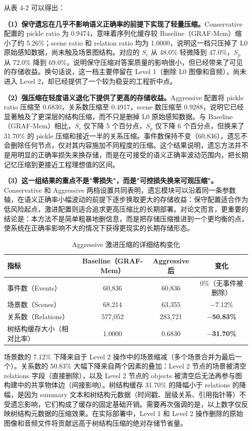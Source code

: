 从表 4-2 可以得出：

\textbf{（1）保守遗忘在几乎不影响语义正确率的前提下实现了轻量压缩。}Conservative 配置的 pickle ratio 为 0.9474，意味着序列化缓存较 Baseline（GRAF-Mem）缩小了约 5.26\%；scene ratio 和 relation ratio 均为 1.0000，说明这一档只压掉了 L0 原始感知数据，尚未触及场景图结构。对应的 $S_c$ 从 48.0\% 轻微降到 47.0\%，$S_p$ 从 72.0\% 降到 69.0\%，说明保守压缩对答案质量的影响很小，但已经带来了可见的存储收益。换句话说，这一档主要停留在 Level 1（删除 L0 图像和音频），尚未进入 Level 2，却已经提供了一个较为稳妥的工程折中点。

\textbf{（2）强压缩在轻度语义退化下提供了更高的存储收益。}Aggressive 配置将 pickle ratio 压缩至 0.6830，关系数压缩至 0.4917，scene 数压缩至 0.9288，说明它已经显著触及了更深层的结构压缩，而不只是删掉 L0 原始感知数据。与 Baseline（GRAF-Mem）相比，$S_c$ 仅下降 5 个百分点，$S_p$ 仅下降 6 个百分点，但换来了 31.70\% 的 pickle 压缩和接近一半的关系压缩。事件数保持不变（60,836），遗忘不会删除任何节点，仅对其内容施加不同程度的压缩。这个结果说明，遗忘方法并不是用明显的正确率损失来换存储，而是在可接受的语义正确率波动范围内，把长期记忆压缩到更接近工程理想值的区间。

\textbf{（3）这一组结果的重点不是"零损失"，而是"可控损失换来可观压缩"。}Conservative 和 Aggressive 两档设置共同表明，遗忘模块可以沿着同一条参数轴，在语义正确率小幅波动的前提下逐步换取更大的存储收益：保守配置适合作为低风险起点，激进配置则适合追求更高压缩比的长期部署。对论文而言，更重要的结论是：本方法不是简单粗暴地删信息，而是把存储压缩推进到一个更均衡的点，使系统在正确率影响不大的情况下获得更现实的长期存储形态。

\begin{table}[htbp]
\centering
\caption{Aggressive 激进压缩的详细结构变化}
\label{tab:4-3}
\begin{tabular}{lccc}
\toprule
指标 & Baseline（GRAF-Mem） & Aggressive 后 & 变化 \\
\midrule
事件数（Events） & 60,836 & 60,836 & 0\%（无事件被删除） \\
场景数（Scenes） & 68,214 & 63,355 & $-$7.12\% \\
关系数（Relations） & 577,052 & 283,721 & \textbf{$-$50.83\%} \\
树结构缓存大小（相对比率） & 1.0000 & 0.6830 & \textbf{$-$31.70\%} \\
\bottomrule
\end{tabular}
\end{table}

场景数的 7.12\% 下降来自于 Level 2 操作中的场景缩减（多个场景合并为最后一个）。关系数的 50.83\% 大幅下降来自两个因素的叠加：Level 2 节点的场景被清空 relations 字段（直接删除），以及 Level 2 节点的 objects 被清空后无法再参与图构建中的共享物体边（间接影响）。树结构缓存 31.70\% 的降幅小于 relations 的降幅，是因为 summary 文本和树结构元数据（时间戳、层级关系、引用指针等）不受遗忘影响，它们构成了缓存的固定基础开销。需要再次强调的是，以上数字仅反映树结构元数据的压缩效果。在实际部署中，Level 1 和 Level 2 操作删除的原始图像和音频文件将贡献远高于树结构压缩的绝对存储节省量。

